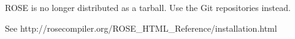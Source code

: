 ROSE is no longer distributed as a tarball. Use the Git repositories
instead.

See http://rosecompiler.org/ROSE\_HTML\_Reference/installation.html

